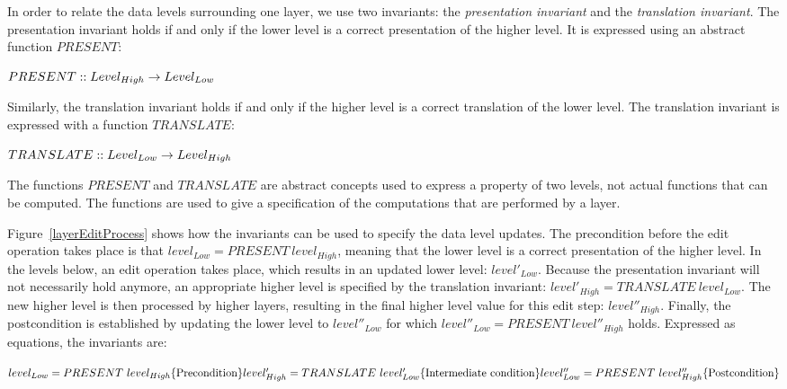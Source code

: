 In order to relate the data levels surrounding one layer, we use two invariants: the {\em presentation invariant} and the {\em translation invariant}. The presentation invariant holds if and only if the lower level is a correct presentation of the higher level. It is expressed using an abstract function $PRESENT$:

\begin{math}
PRESENT :: Level_{High} \rightarrow Level_{Low} \\
\end{math}

Similarly, the translation invariant holds if and only if the higher level is a correct translation of the lower level. The translation invariant is expressed with a function $TRANSLATE$:

\begin{math}
TRANSLATE ::  Level_{Low} \rightarrow Level_{High} \\
\end{math}

The functions $PRESENT$ and $TRANSLATE$ are abstract concepts used to express a property of two levels, not actual functions that can be computed. The functions are used to give a specification of the computations that are performed by a layer.

Figure~\ref{layerEditProcess} shows how the invariants can be used to specify the data level updates. The precondition before the edit operation takes place is that $level_{Low} = PRESENT~level_{High}$, meaning that the lower level is a correct presentation of the higher level. In the levels below, an edit operation takes place, which results in an updated lower level: $level'_{Low}$. Because the presentation invariant will not necessarily hold anymore, an appropriate higher level is specified by the translation invariant:
$level'_{High} = TRANSLATE~level_{Low}$. The new higher level is then processed by higher layers, resulting in the final higher level value for this edit step: $level''_{High}$. Finally, the postcondition is established by updating the lower level to $level''_{Low}$ for which 
$level''_{Low} = PRESENT~level''_{High}$ holds. Expressed as equations, the invariants  are:

\begin{math}
level_{Low} = PRESENT~level_{High}\hfill \text{\{Precondition\}}\\
level'_{High} = TRANSLATE~level'_{Low}\hfill \text{\{Intermediate condition\}}\\
level''_{Low} = PRESENT~level''_{High}\hfill \text{\{Postcondition\}}\\
\end{math}

